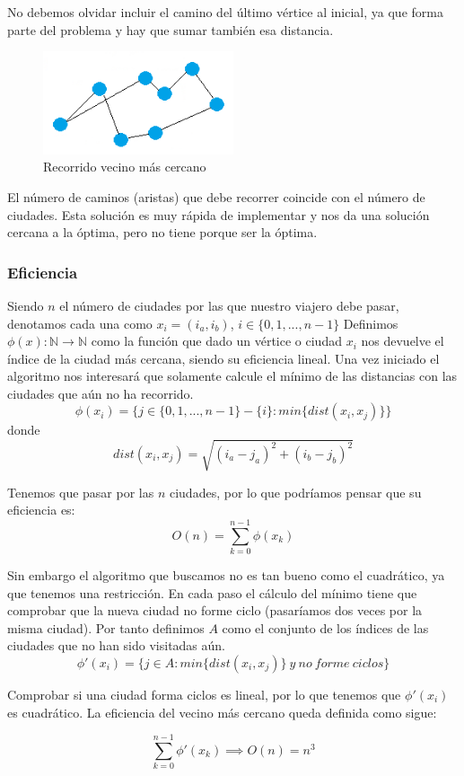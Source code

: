 No debemos olvidar incluir el camino del último vértice al inicial, ya que forma parte del problema y hay que sumar también esa distancia.

\begin{figure}[htbH] 
	\centering
	\includegraphics[width=0.5\textwidth]{./Imagenes/vecino8.png}
	\caption{Recorrido vecino más cercano} 
\end{figure}

El número de caminos (aristas) que debe recorrer coincide con el número de ciudades.
Esta solución es muy rápida de implementar y nos da una solución cercana a la óptima, pero no tiene porque ser la óptima.

\newpage


\newpage
\subsubsection{Eficiencia}
Siendo $n$ el número de ciudades por las que nuestro viajero debe pasar, denotamos cada una como $x_i=(i_a, i_b)$, $i\in\{0,1,...,n-1\}$
Definimos $\phi (x):\mathbb{N} \rightarrow \mathbb{N}$ como la función que dado un vértice o ciudad $x_i$ nos devuelve el 
índice de la ciudad más cercana, siendo su eficiencia lineal. Una vez iniciado el algoritmo nos interesará que solamente calcule
el mínimo de las distancias con las ciudades que aún no ha recorrido.
\[\phi (x_i) = \{j \in\{0,1,...,n-1\}-\{i\} : min\{dist(x_i, x_j)\} \}\]
donde 
\[ dist(x_i, x_j) = \sqrt{(i_a-j_a)^2+(i_b-j_b)^2} \]

Tenemos que pasar por las $n$ ciudades, por lo que podríamos pensar que su eficiencia es:
\[O(n) = \sum_{k=0}^{n-1} \phi (x_k)  \]

Sin embargo el algoritmo que buscamos no es tan bueno como el cuadrático, ya que tenemos una restricción. En cada paso el cálculo
del mínimo tiene que comprobar que la nueva ciudad no forme ciclo (pasaríamos dos veces por la misma ciudad).
Por tanto definimos $A$ como el conjunto de los índices de las ciudades que no han sido visitadas aún.
\[\phi '(x_i) = \{j \in A : min\{dist(x_i, x_j)\} \ y \ no \ forme \ ciclos \}\]

Comprobar si una ciudad forma ciclos es lineal, por lo que tenemos que $\phi '(x_i)$ es cuadrático.
La eficiencia del vecino más cercano queda definida como sigue:

\[ \sum_{k=0}^{n-1}\phi ' (x_k) \implies O(n) = n^3\]